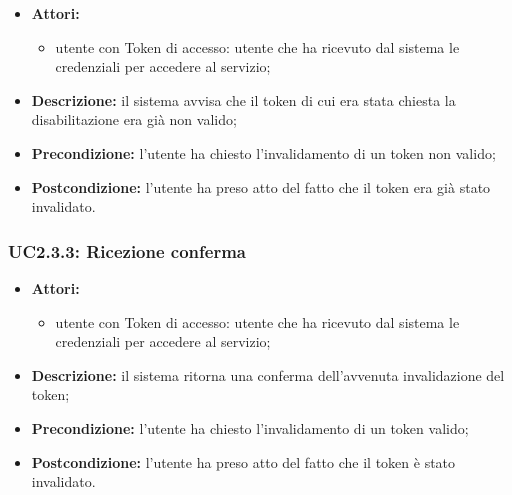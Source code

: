 \begin{itemize}
	\item \textbf{Attori:}
	\begin{itemize}
		\item utente con Token di accesso: utente che ha ricevuto dal sistema le credenziali per accedere al servizio;
	\end{itemize}
	\item \textbf{Descrizione:} il sistema avvisa che il token di cui era stata chiesta la disabilitazione era già non valido;
	\item \textbf{Precondizione:} l'utente ha chiesto l'invalidamento di un token non valido;
	\item \textbf{Postcondizione:} l'utente ha preso atto del fatto che il token era già stato invalidato.
\end{itemize}

\subsubsection{UC2.3.3: Ricezione conferma}

\begin{itemize}
	\item \textbf{Attori:}
	\begin{itemize}
		\item utente con Token di accesso: utente che ha ricevuto dal sistema le credenziali per accedere al servizio;
	\end{itemize}
	\item \textbf{Descrizione:} il sistema ritorna una conferma dell'avvenuta invalidazione del token;
	\item \textbf{Precondizione:} l'utente ha chiesto l'invalidamento di un token valido;
	\item \textbf{Postcondizione:} l'utente ha preso atto del fatto che il token è stato invalidato.
\end{itemize}


\pagebreak
